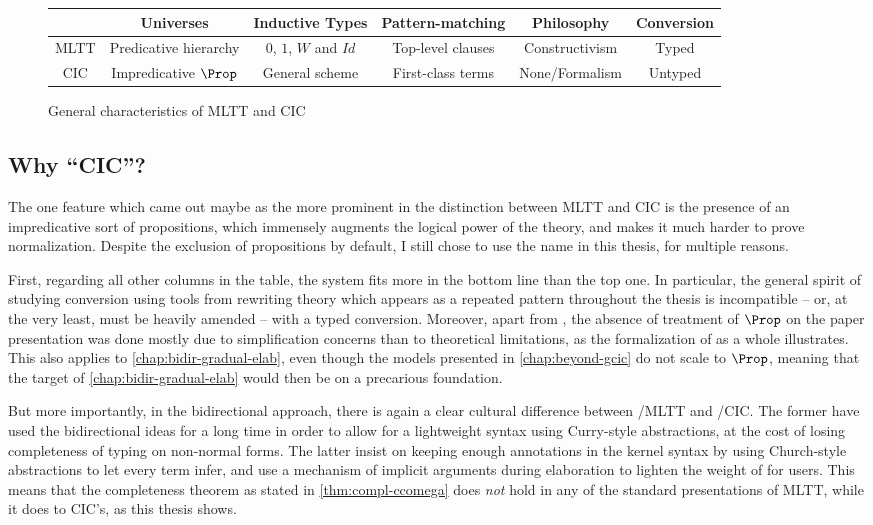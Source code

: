 \begin{figure*}[h]
  \begin{tabular}{cccccc}
    \rule{0pt}{4ex} & Universes & Inductive Types & Pattern-matching & Philosophy & Conversion \\
    \hline
    MLTT \rule{0pt}{4ex} & Predicative hierarchy & $0$, $1$, $W$ and $Id$ & Top-level clauses & Constructivism & Typed \\
    CIC \rule{0pt}{4ex} & Impredicative $\Prop$ & General scheme & First-class terms & None/Formalism & Untyped
  \end{tabular}
  \caption{General characteristics of MLTT and CIC}
  \label{fig:mltt-cic}
\end{figure*}

\subsection*{Why “CIC”?}

The one feature which came out maybe as the more prominent in the distinction between MLTT and
CIC is the presence of an impredicative sort of propositions, which immensely augments the
logical power of the theory, and makes it much harder to prove normalization.
Despite the exclusion of propositions by default, I still chose to use the name 
in this thesis, for multiple reasons.

First, regarding all other columns in the table, the system fits more
in the bottom line than the top one. In particular, the general spirit of studying
conversion using tools from rewriting theory which appears as a repeated pattern throughout
the thesis is incompatible – or, at the very least, must be heavily amended –
with a typed conversion.
Moreover, apart from , the absence of
treatment of $\Prop$ on the paper presentation was done mostly due to simplification concerns
than to theoretical limitations, as the formalization of  as a whole illustrates.
This also applies to \cref{chap:bidir-gradual-elab}, even though the models presented
in \cref{chap:beyond-gcic} do not scale to $\Prop$, meaning that the target
of \cref{chap:bidir-gradual-elab} would then be on a precarious foundation.

But more importantly, in the bidirectional approach,
there is again a clear cultural difference between
/MLTT and /CIC. The former have used the bidirectional ideas for a long
time in order to allow for a lightweight syntax using Curry-style abstractions,
at the cost of losing completeness of typing on non-normal forms.%
%
The latter insist on keeping enough annotations in the kernel syntax by using Church-style
abstractions to let every term infer,
and use a mechanism of implicit arguments during elaboration to lighten the weight of for users.
This means that the completeness theorem as stated in \cref{thm:compl-ccomega}
does \emph{not} hold in any of the standard presentations of MLTT,
while it does to CIC’s, as this thesis shows.


